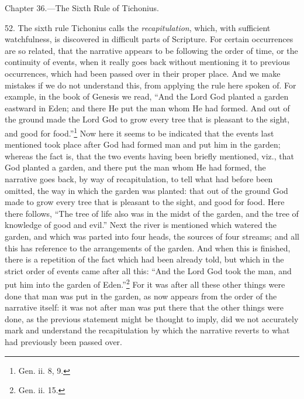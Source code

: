 
Chapter 36.—The Sixth Rule of Tichonius.

52. The sixth rule Tichonius calls the \emph{recapitulation}, which, with sufficient watchfulness, is discovered in difficult parts of Scripture. For certain occurrences are so related, that the narrative appears to be following the order of time, or the continuity of events, when it really goes back without mentioning it to previous occurrences, which had been passed over in their proper place. And we make mistakes if we do not understand this, from applying the rule here spoken of. For example, in the book of Genesis we read, “And the Lord God planted a garden eastward in Eden; and there He put the man whom He had formed. And out of the ground made the Lord God to grow every tree that is pleasant to the sight, and good for food.”\footnote{Gen. ii. 8, 9.} Now here it seems to be indicated that the events last mentioned took place after God had formed man and put him in the garden; whereas the fact is, that the two events having been briefly mentioned, viz., that God planted a garden, and there put the man whom He had formed, the narrative goes back, by way of recapitulation, to tell what had before been omitted, the way in which the garden was planted: that out of the ground God made to grow every tree that is pleasant to the sight, and good for food. Here there follows, “The tree of life also was in the midst of the garden, and the tree of knowledge of good and evil.” Next the river is mentioned which watered the garden, and which was parted into four heads, the sources of four streams; and all this has reference to the arrangements of the garden. And when this is finished, there is a repetition of the fact which had been already told, but which in the strict order of events came after all this: “And the Lord God took the man, and put him into the garden of Eden.”\footnote{Gen. ii. 15.} For it was after all these other things were done that man was put in the garden, as now appears from the order of the narrative itself: it was not after man was put there that the other things were done, as the previous statement might be thought to imply, did we not accurately mark and understand the recapitulation by which the narrative reverts to what had previously been passed over.

